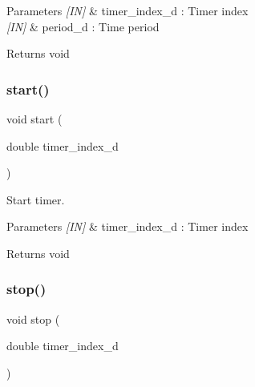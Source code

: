 \begin{DoxyParams}{Parameters}
{\em \mbox{[}\+I\+N\mbox{]}} & timer\+\_\+index\+\_\+d \+: Timer index \\
\hline
{\em \mbox{[}\+I\+N\mbox{]}} & period\+\_\+d \+: Time period \\
\hline
\end{DoxyParams}
\begin{DoxyReturn}{Returns}
void 
\end{DoxyReturn}
\mbox{\label{classtimer_aa5098af6c680dea87be85b228a7e8fc7}} 
\subsubsection{start()}
{\footnotesize\ttfamily void start (\begin{DoxyParamCaption}\item[{double}]{timer\+\_\+index\+\_\+d }\end{DoxyParamCaption})}



Start timer. 


\begin{DoxyCode}{0}
\DoxyCodeLine{\{}
\DoxyCodeLine{\}}
\end{DoxyCode}



\begin{DoxyParams}{Parameters}
{\em \mbox{[}\+I\+N\mbox{]}} & timer\+\_\+index\+\_\+d \+: Timer index \\
\hline
\end{DoxyParams}
\begin{DoxyReturn}{Returns}
void 
\end{DoxyReturn}
\mbox{\label{classtimer_aab4afb35da82a8ff268383d7dde876bb}} 
\subsubsection{stop()}
{\footnotesize\ttfamily void stop (\begin{DoxyParamCaption}\item[{double}]{timer\+\_\+index\+\_\+d }\end{DoxyParamCaption})}



